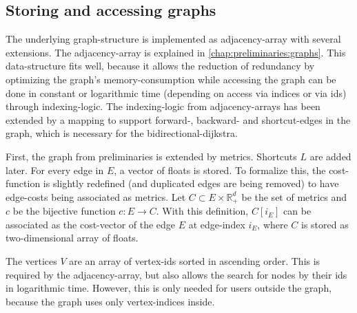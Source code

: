     \subsection{Storing and accessing graphs}
    \label{chap:balancing:implementation:graphs}

        The underlying graph-structure is implemented as adjacency-array with several extensions.
        The adjacency-array is explained in \cref{chap:preliminaries:graphs}.
        This data-structure fits well, because it allows the reduction of redundancy by optimizing the graph's memory-consumption while accessing the graph can be done in constant or logarithmic time (depending on access via indices or via ids) through indexing-logic.
        The indexing-logic from adjacency-arrays has been extended by a mapping to support forward-, backward- and shortcut-edges in the graph, which is necessary for the bidirectional-\gls{dijkstra}.

        First, the graph from preliminaries is extended by \glspl{metric}.
        Shortcuts $L$ are added later.
        For every edge in $E$, a vector of floats is stored.
        To formalize this, the cost-function is slightly redefined (and duplicated edges are being removed) to have edge-costs being associated as \glspl{metric}.
        Let $C \subset E \times \mathbb{R}_+^d$ be the set of \glspl{metric} and $c$ be the bijective function $c: E \to C$.
        With this definition, $C[i_E]$ can be associated as the cost-vector of the edge $E$ at edge-index $i_E$, where $C$ is stored as two-dimensional array of floats.

        The vertices $V$ are an array of vertex-ids sorted in ascending order.
        This is required by the adjacency-array, but also allows the search for nodes by their ids in logarithmic time.
        However, this is only needed for users outside the graph, because the graph uses only vertex-indices inside.

